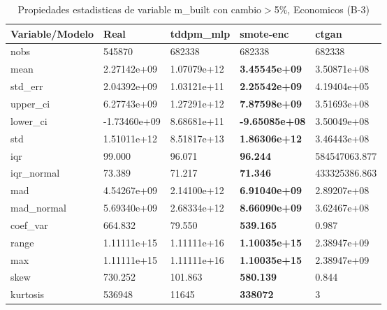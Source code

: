 \begin{table}[H]
\centering
\fontsize{8}{14}\selectfont
\caption{Propiedades estadisticas de variable m\_built con cambio\ensuremath{>}5\%, Economicos (B-3)}
\label{table-stats-economicos-b-3-m_built-short}
\begin{tabular}{|l|m{10em}|m{10em}|m{10em}|m{10em}|}
\hline
 \rowcolor[gray]{0.8}
Variable/Modelo & Real & tddpm\_mlp & smote-enc & ctgan \\
\hline nobs & 545870 & 682338 & 682338 & 682338 \\
\hline mean & 2.27142e+09 & \cellcolor[rgb]{0.9, 0.54, 0.52} 1.07079e+12 & \bfseries 3.45545e+09 & 3.50871e+08 \\
\hline std\_err & 2.04392e+09 & \cellcolor[rgb]{0.9, 0.54, 0.52} 1.03121e+11 & \bfseries 2.25542e+09 & 4.19404e+05 \\
\hline upper\_ci & 6.27743e+09 & \cellcolor[rgb]{0.9, 0.54, 0.52} 1.27291e+12 & \bfseries 7.87598e+09 & 3.51693e+08 \\
\hline lower\_ci & -1.73460e+09 & \cellcolor[rgb]{0.9, 0.54, 0.52} 8.68681e+11 & \bfseries -9.65085e+08 & 3.50049e+08 \\
\hline std & 1.51011e+12 & \cellcolor[rgb]{0.9, 0.54, 0.52} 8.51817e+13 & \bfseries 1.86306e+12 & 3.46443e+08 \\
\hline iqr & 99.000 & 96.071 & \bfseries 96.244 & \cellcolor[rgb]{0.9, 0.54, 0.52} 584547063.877 \\
\hline iqr\_normal & 73.389 & 71.217 & \bfseries 71.346 & \cellcolor[rgb]{0.9, 0.54, 0.52} 433325386.863 \\
\hline mad & 4.54267e+09 & \cellcolor[rgb]{0.9, 0.54, 0.52} 2.14100e+12 & \bfseries 6.91040e+09 & 2.89207e+08 \\
\hline mad\_normal & 5.69340e+09 & \cellcolor[rgb]{0.9, 0.54, 0.52} 2.68334e+12 & \bfseries 8.66090e+09 & 3.62467e+08 \\
\hline coef\_var & 664.832 & 79.550 & \bfseries 539.165 & \cellcolor[rgb]{0.9, 0.54, 0.52} 0.987 \\
\hline range & 1.11111e+15 & \cellcolor[rgb]{0.9, 0.54, 0.52} 1.11111e+16 & \bfseries 1.10035e+15 & 2.38947e+09 \\
\hline max & 1.11111e+15 & \cellcolor[rgb]{0.9, 0.54, 0.52} 1.11111e+16 & \bfseries 1.10035e+15 & 2.38947e+09 \\
\hline skew & 730.252 & 101.863 & \bfseries 580.139 & \cellcolor[rgb]{0.9, 0.54, 0.52} 0.844 \\
\hline kurtosis & 536948 & 11645 & \bfseries 338072 & \cellcolor[rgb]{0.9, 0.54, 0.52} 3 \\

\end{tabular}
\end{table}
